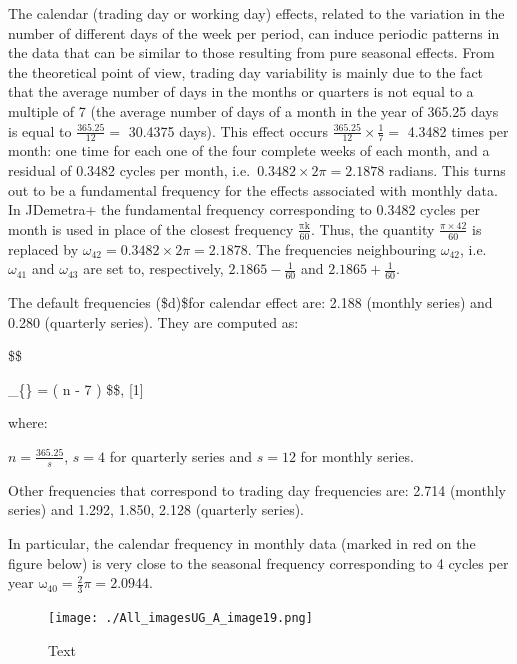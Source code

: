 \documentclass[
  letterpaper,
  DIV=11,
  numbers=noendperiod]{scrreprt}
\begin{document}
The calendar (trading day or working day) effects, related to the
variation in the number of different days of the week per period, can
induce periodic patterns in the data that can be similar to those
resulting from pure seasonal effects. From the theoretical point of
view, trading day variability is mainly due to the fact that the average
number of days in the months or quarters is not equal to a multiple of 7
(the average number of days of a month in the year of 365.25 days is
equal to \(\frac{365.25}{12} =\) 30.4375 days). This effect occurs
\(\frac{365.25}{12} \times \frac{1}{7} =\) 4.3482 times per month: one
time for each one of the four complete weeks of each month, and a
residual of 0.3482 cycles per month,
i.e.~\(0.3482 \times 2\pi = 2.1878\) radians. This turns out to be a
fundamental frequency for the effects associated with monthly data. In
JDemetra+ the fundamental frequency corresponding to 0.3482 cycles per
month is used in place of the closest frequency
\(\frac{\text{πk}}{60}\). Thus, the quantity
\(\frac{\pi \times 42}{60}\) is replaced by
\(\omega_{42} = 0.3482 \times 2\pi = 2.1878\). The frequencies
neighbouring \(\omega_{42}\), i.e.~\(\omega_{41}\) and \(\omega_{43}\)
are set to, respectively, \(2.1865 - \frac{1}{60}\) and
\(2.1865 + \frac{1}{60}\).

The default frequencies (\$d)\$for calendar effect are: 2.188 (monthly
series) and 0.280 (quarterly series). They are computed as:

\$\$

\omega\_\{\} = \left( n - 7
\times \left\lbrack {} \right\rbrack \right) \$\$, {[}1{]}

where:

\(n = \frac{365.25}{s}\), \(s = 4\) for quarterly series and \(s = 12\)
for monthly series.

Other frequencies that correspond to trading day frequencies are: 2.714
(monthly series) and 1.292, 1.850, 2.128 (quarterly series).

In particular, the calendar frequency in monthly data (marked in red on
the figure below) is very close to the seasonal frequency corresponding
to 4 cycles per year \(\text{ω}_{40} = \frac{2}{3}\pi = 2.0944\).

\begin{figure}

{\centering \texttt{[image: ./All\_imagesUG\_A\_image19.png]}

}

\caption{Text}

\end{figure}
\end{document}
